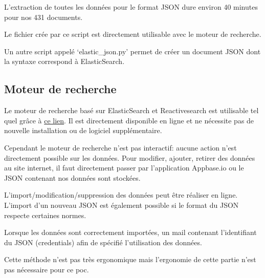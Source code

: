 L'extraction de toutes les données pour le format JSON dure environ 40 minutes pour nos 431 documents.

Le fichier crée par ce script est directement utilisable avec le moteur de recherche.

Un autre script appelé `elastic\_json.py' permet de créer un document JSON dont la syntaxe correspond à ElasticSearch.

\subsection{Moteur de recherche}
Le moteur de recherche basé sur ElasticSearch et Reactivesearch est utilisable tel quel grâce à \href{https://ujcqr.csb.app}{ce lien}.
Il est directement disponible en ligne et ne nécessite pas de nouvelle installation ou de logiciel supplémentaire.

Cependant le moteur de recherche n'est pas interactif: aucune action n'est directement possible sur les données.
Pour modifier, ajouter, retirer des données au site internet, il faut directement passer par l'application Appbase.io ou le JSON contenant nos données sont stockées.

L'import/modification/suppression des données peut être réaliser en ligne.
L'import d'un nouveau JSON est également possible si le format du JSON respecte certaines normes. 

Lorsque les données sont correctement importées, un mail contenant l'identifiant du JSON (credentials) afin de spécifié l'utilisation des données. 

Cette méthode n'est pas très ergonomique mais l'ergonomie de cette partie n'est pas nécessaire pour ce \gls{poc}\@.



